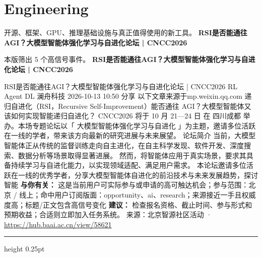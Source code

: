 \documentclass[10.5pt]{ctexart}
\begin{document}
\section*{Engineering}
{\color{ormuted} 开源、框架、GPU、推理基础设施与真正值得使用的新工具。}
\vspace{2mm}
{\LARGE\bfseries RSI是否能通往AGI？大模型智能体强化学习与自进化论坛 | CNCC2026}\par
\vspace{1mm}
{\color{ormuted} 本版筛出 5 个高信号事件。}
\vspace{3mm}
{\Large\bfseries RSI是否能通往AGI？大模型智能体强化学习与自进化论坛 | CNCC2026}\par
RSI是否能通往AGI？大模型智能体强化学习与自进化论坛 | CNCC2026 RL Agent DL 澜舟科技 2026-10-13 10:50 分享 以下文章来源于mp.weixin.qq.com 递归自进化（RSI，Recursive Self-Improvement）能否通往 AGI？大模型智能体又该如何实现智能递归自进化？ CNCC2026 将于 10 月 21—24 日 在 四川成都 举办。本场专题论坛以「 大模型智能体强化学习与自进化 」为主题，邀请多位活跃在一线的学者，带来该方向最新的研究进展与未来展望。 论坛简介 当前，大模型智能体正从传统的监督训练走向自主进化，在自主科学发现、软件开发、深度搜索、数据分析等场景取得显著进展。 然而，将智能体应用于真实场景，要求其具备持续学习与自进化能力，以实现领域适配、满足用户需求。 本论坛邀请多位活跃在一线的优秀学者，分享大模型智能体自进化的前沿技术与未来发展趋势，探讨智能
\textbf{与你有关：} 这是当前用户可实际参与或申请的高可触达机会；参与范围：北京 / 线上；命中用户订阅版面：opportunity、ai、research；来源接近一手且权威度高；标题/正文包含高信号变化
\textbf{建议：} 检查报名资格、截止时间、参与形式和预期收益；合适则立即加入任务系统。
{\footnotesize\color{ormuted} 来源：北京智源社区活动 · \url{https://hub.baai.ac.cn/view/58621}}
\vspace{4mm}
\hrule height 0.25pt
\vspace{3mm}
\end{document}
